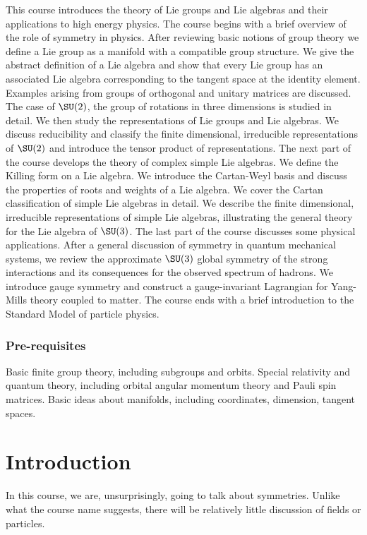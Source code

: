 \documentclass[a4paper]{article}
\begin{document}
\maketitle
{\small
\setlength{\parindent}{0em}
\setlength{\parskip}{1em}

This course introduces the theory of Lie groups and Lie algebras and their applications to high energy physics. The course begins with a brief overview of the role of symmetry in physics. After reviewing basic notions of group theory we define a Lie group as a manifold with a compatible group structure. We give the abstract definition of a Lie algebra and show that every Lie group has an associated Lie algebra corresponding to the tangent space at the identity element. Examples arising from groups of orthogonal and unitary matrices are discussed. The case of $\SU(2)$, the group of rotations in three dimensions is studied in detail. We then study the representations of Lie groups and Lie algebras. We discuss reducibility and classify the finite dimensional, irreducible representations of $\SU(2)$ and introduce the tensor product of representations. The next part of the course develops the theory of complex simple Lie algebras. We define the Killing form on a Lie algebra. We introduce the Cartan-Weyl basis and discuss the properties of roots and weights of a Lie algebra. We cover the Cartan classification of simple Lie algebras in detail. We describe the finite dimensional, irreducible representations of simple Lie algebras, illustrating the general theory for the Lie algebra of $\SU(3)$. The last part of the course discusses some physical applications. After a general discussion of symmetry in quantum mechanical systems, we review the approximate $\SU(3)$ global symmetry of the strong interactions and its consequences for the observed spectrum of hadrons. We introduce gauge symmetry and construct a gauge-invariant Lagrangian for Yang-Mills theory coupled to matter. The course ends with a brief introduction to the Standard Model of particle physics.

\subsubsection*{Pre-requisites}
Basic finite group theory, including subgroups and orbits. Special relativity and quantum theory, including orbital angular momentum theory and Pauli spin matrices. Basic ideas about manifolds, including coordinates, dimension, tangent spaces.
}
\tableofcontents

\section{Introduction}
In this course, we are, unsurprisingly, going to talk about symmetries. Unlike what the course name suggests, there will be relatively little discussion of fields or particles.
\end{document}
